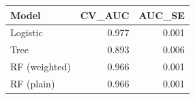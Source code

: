 
\begin{tabular}{lrr}
\toprule
Model & CV\_AUC & AUC\_SE\\
\midrule
Logistic & 0.977 & 0.001\\
Tree & 0.893 & 0.006\\
RF (weighted) & 0.966 & 0.001\\
RF (plain) & 0.966 & 0.001\\
\bottomrule
\end{tabular}
